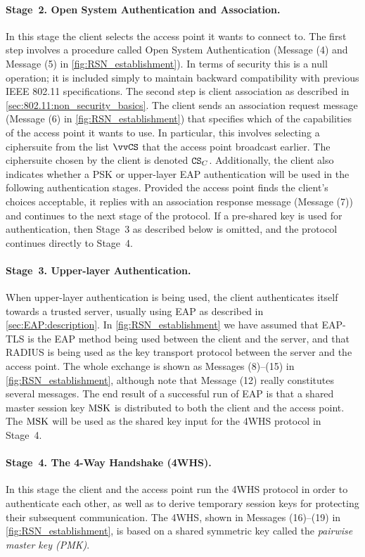 \paragraph{Stage~2. Open System Authentication and Association.}
In this stage the client selects the access point it wants to connect to.
The first step involves a procedure called Open System Authentication (Message (4) and Message (5) in \cref{fig:RSN_establishment}).
In terms of security this is a null operation;
it is included simply to maintain backward compatibility with previous IEEE 802.11 specifications.
The second step is client association as described in \cref{sec:802.11:non_security_basics}.
The client sends an association request message (Message (6) in \cref{fig:RSN_establishment}) that specifies which of the capabilities of the access point it wants to use. 
In particular,
this involves selecting a ciphersuite from the list $\CSlist$ that the access point broadcast earlier.
The ciphersuite chosen by the client is denoted $\mathtt{CS}_C$.
Additionally,
the client also indicates whether a PSK or upper-layer  EAP authentication will be used in the following authentication stages.
Provided the access point finds the client's choices acceptable,
it replies with an association response message (Message (7)) and continues to the next stage of the protocol.
If a pre-shared key is used for authentication,
then Stage~3 as described below is omitted,
and the protocol continues directly to Stage~4.

\paragraph{Stage~3. Upper-layer Authentication.}
When upper-layer authentication is being used,
the client  authenticates itself towards a trusted server,
usually using EAP as described in \cref{sec:EAP:description}.
In \cref{fig:RSN_establishment} we have assumed that EAP-TLS is the EAP method being used between the client and the server,
and that RADIUS is being used as the key transport protocol between the server and the access point.
The whole exchange is shown as Messages (8)--(15) in \cref{fig:RSN_establishment},
although note that Message (12) really constitutes several messages. 
The end result of a successful run of EAP is that a shared master session key $\mathrm{MSK}$ is distributed to both the client and the access point.
The $\mathrm{MSK}$ will be used as the shared key input for the 4WHS  protocol in Stage~4.



\paragraph{Stage~4. The 4-Way Handshake (4WHS).}
In this stage the client and the access point run the 4WHS protocol in order to authenticate each other,
as well as to derive temporary session keys for protecting their subsequent communication.
The 4WHS, 
shown in Messages (16)--(19) in \cref{fig:RSN_establishment},
is based on a shared symmetric  key called the \emph{pairwise master key (PMK)}.

